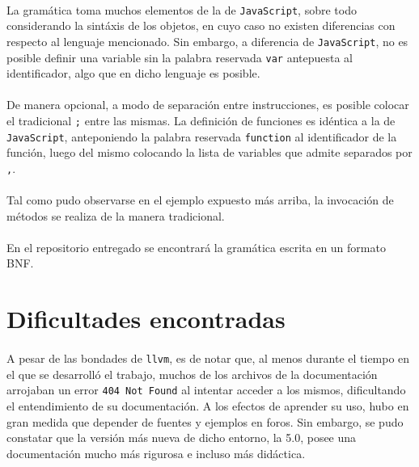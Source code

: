 \documentclass[12pt]{article}
\begin{document}
	\paragraph{} La gramática toma muchos elementos de la de \verb|JavaScript|, sobre todo considerando la sintáxis de los objetos, en cuyo caso no existen diferencias con respecto al lenguaje mencionado. Sin embargo, a diferencia de \verb|JavaScript|, no es posible definir una variable sin la palabra reservada \verb|var| antepuesta al identificador, algo que en dicho lenguaje es posible.
	
	\paragraph{} De manera opcional, a modo de separación entre instrucciones, es posible colocar el tradicional \verb|;| entre las mismas. La definición de funciones es idéntica a la de \verb|JavaScript|, anteponiendo la palabra reservada \verb|function| al identificador de la función, luego del mismo colocando la lista de variables que admite separados por \verb|,|.
	
	\paragraph{} Tal como pudo observarse en el ejemplo expuesto más arriba, la invocación de métodos se realiza de la manera tradicional.
	
	\paragraph{} En el repositorio entregado se encontrará la gramática escrita en un formato BNF.
	
	\section{Dificultades encontradas}
	
	\paragraph{} A pesar de las bondades de \verb|llvm|, es de notar que, al menos durante el tiempo en el que se desarrolló el trabajo, muchos de los archivos de la documentación arrojaban un error \verb|404 Not Found| al intentar acceder a los mismos, dificultando el entendimiento de su documentación. A los efectos de aprender su uso, hubo en gran medida que depender de fuentes y ejemplos en foros. Sin embargo, se pudo constatar que la versión más nueva de dicho entorno, la 5.0, posee una documentación mucho más rigurosa e incluso más didáctica. 
	
\end{document}
